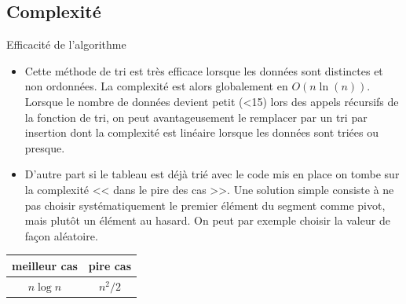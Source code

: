 \subsection{Complexité}
\begin{prop}{Efficacité de l'algorithme}
\begin{itemize}
\item Cette méthode de tri est très efficace lorsque les données sont distinctes et non ordonnées. La complexité est alors globalement en $O(n \ln(n))$. Lorsque le nombre de données devient petit (<15) lors des appels récursifs de la fonction de tri, on peut avantageusement le remplacer par un tri par insertion dont la complexité est linéaire lorsque les données sont triées ou presque. \cite{Beynet}




\item D'autre part si le tableau est déjà trié avec le code mis en place on tombe sur la complexité << dans le pire des cas >>. Une solution simple consiste à ne pas choisir systématiquement
le premier élément du segment comme pivot, mais plutôt un élément au hasard. On peut par exemple choisir la valeur de façon aléatoire. \cite{wack}
\end{itemize}

\begin{center}
\begin{tabular}{|c|c|}
\hline 
 meilleur cas &  pire cas \\ 
\hline 
$n \log n$ & $n^2/2$ \\ 
\hline 
\end{tabular} 
\end{center}



\end{prop}






